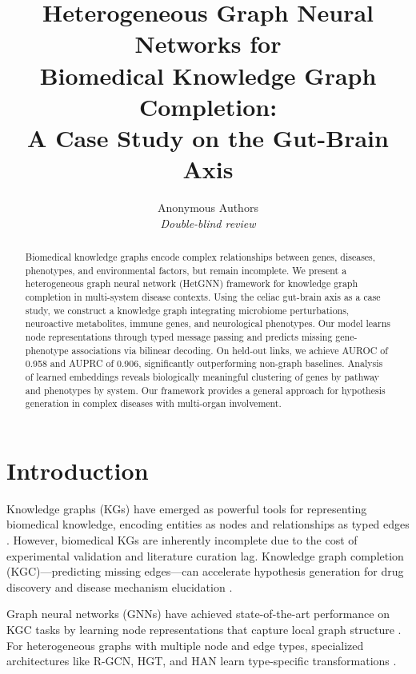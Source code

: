 \documentclass{article}
\title{Heterogeneous Graph Neural Networks for\\Biomedical Knowledge Graph Completion:\\A Case Study on the Gut-Brain Axis}
\author{
    Anonymous Authors\\
    \textit{Double-blind review}
}
\date{}
\begin{document}
\maketitle

\begin{abstract}
Biomedical knowledge graphs encode complex relationships between genes, diseases, phenotypes, and environmental factors, but remain incomplete. We present a heterogeneous graph neural network (HetGNN) framework for knowledge graph completion in multi-system disease contexts. Using the celiac gut-brain axis as a case study, we construct a knowledge graph integrating microbiome perturbations, neuroactive metabolites, immune genes, and neurological phenotypes. Our model learns node representations through typed message passing and predicts missing gene-phenotype associations via bilinear decoding. On held-out links, we achieve AUROC of 0.958 and AUPRC of 0.906, significantly outperforming non-graph baselines. Analysis of learned embeddings reveals biologically meaningful clustering of genes by pathway and phenotypes by system. Our framework provides a general approach for hypothesis generation in complex diseases with multi-organ involvement.
\end{abstract}

\section{Introduction}

Knowledge graphs (KGs) have emerged as powerful tools for representing biomedical knowledge, encoding entities as nodes and relationships as typed edges \citep{himmelstein2017systematic}. However, biomedical KGs are inherently incomplete due to the cost of experimental validation and literature curation lag. Knowledge graph completion (KGC)---predicting missing edges---can accelerate hypothesis generation for drug discovery and disease mechanism elucidation \citep{bonner2022review}.

Graph neural networks (GNNs) have achieved state-of-the-art performance on KGC tasks by learning node representations that capture local graph structure \citep{schlichtkrull2018rgcn}. For heterogeneous graphs with multiple node and edge types, specialized architectures like R-GCN, HGT, and HAN learn type-specific transformations \citep{wang2019han, hu2020hgt}.
\end{document}
